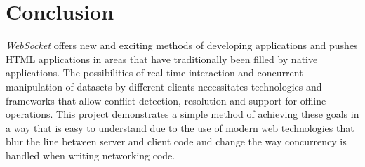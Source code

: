 
\chapter{Conclusion}

\emph{WebSocket} offers new and exciting methods of developing applications and
pushes HTML applications in areas that have traditionally been filled by native
applications. The possibilities of real-time interaction and concurrent
manipulation of datasets by different clients necessitates technologies and
frameworks that allow conflict detection, resolution and support for offline
operations. This project demonstrates a simple method of achieving these goals
in a way that is easy to understand due to the use of modern web technologies
that blur the line between server and client code and change the way concurrency
is handled when writing networking code.
